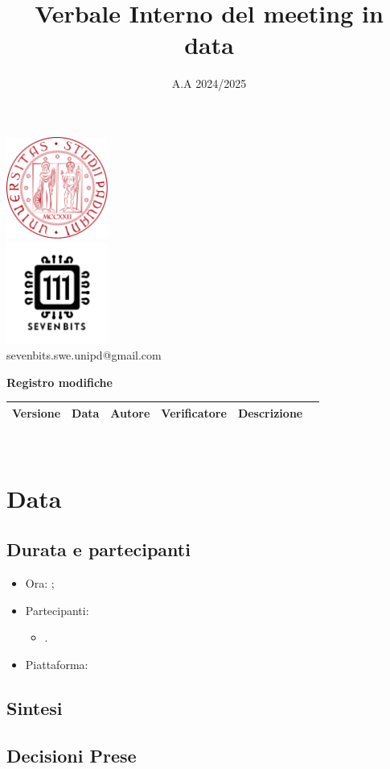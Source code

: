 \documentclass[10pt]{article}
\title{Verbale Interno del meeting in data}
\date{A.A 2024/2025}
\begin{document}
\maketitle
\center 
\includegraphics[width=0.25\textwidth]{LogoUnipd}\\
\includegraphics[width=0.25\textwidth]{Sevenbitslogo}\\
sevenbits.swe.unipd@gmail.com\\
\vspace{2mm}

\textbf{Registro modifiche}\\
\vspace{2mm}
\begin{tabular}{|l|l|l|l|l|l|}
\hline
\textbf{Versione} & \textbf{Data} & \textbf{Autore} & \textbf{Verificatore} & \textbf{Descrizione} \\
\hline
\end{tabular}

\raggedright
\tableofcontents
\
\section{Data}
\subsection{Durata e partecipanti}
\begin{itemize}
\item Ora: ;
\item Partecipanti: 	
	\begin{itemize}
	\item .
	\end{itemize}
\item Piattaforma:
\end{itemize}
\subsection{Sintesi}
\subsection{Decisioni Prese}
\end{document}
